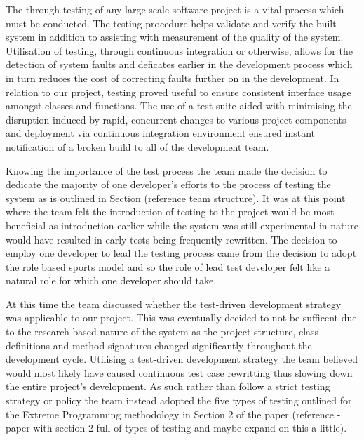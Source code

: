 \documentclass{l3proj}
\begin{document}
The through testing of any large-scale software project is a vital process which must be conducted. The testing procedure helps validate and verify the built system in addition to assisting with measurement of the quality of the system. Utilisation of testing, through continuous integration or otherwise, allows for the detection of system faults and deficates earlier in the development process which in turn reduces the cost of correcting faults further on in the development. In relation to our project, testing proved useful to ensure consistent interface usage amongst classes and functions. The use of a test suite aided with minimising the disruption induced by rapid, concurrent changes to various project components and deployment via continuous integration environment ensured instant notification of a broken build to all of the development team. 

Knowing the importance of the test process the team made the decision to dedicate the majority of one developer's efforts to the process of testing the system as is outlined in Section (reference team structure). It was at this point where the team felt the introduction of testing to the project would be most beneficial as introduction earlier while the system was still experimental in nature would have resulted in early tests being frequently rewritten. The decision to employ one developer to lead the testing process came from the decision to adopt the role based sports model and so the role of lead test developer felt like a natural role for which one developer should take. 

At this time the team discussed whether the test-driven development strategy was applicable to our project. This was eventually decided to not be sufficent due to the research based nature of the system as the project structure, class definitions and method signatures changed significantly throughout the development cycle. Utilising a test-driven development strategy the team believed would most likely have caused continuous test case rewritting thus slowing down the entire project's development. As such rather than follow a strict testing strategy or policy the team instead adopted the five types of testing outlined for the Extreme Programming methodology in Section 2 of the paper (reference - paper with section 2 full of types of testing and maybe expand on this a little).
\end{document}
